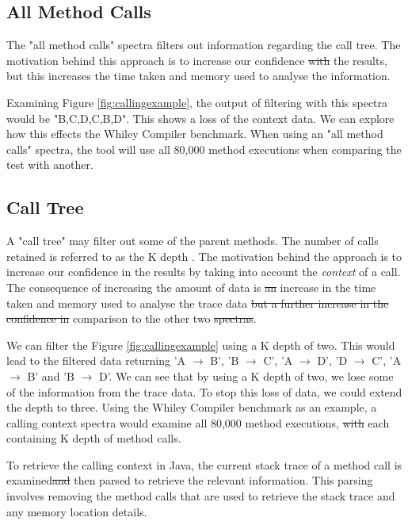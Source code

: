 \documentclass[11pt
              , a4paper
              , twoside
              , openright
              ]{report}
\providecommand{\DIFadd}[1]{{\protect\color{blue}\uwave{#1}}} %
\providecommand{\DIFdel}[1]{{\protect\color{red}\sout{#1}}}                      %
\providecommand{\DIFaddbegin}{} %
\providecommand{\DIFaddend}{} %
\providecommand{\DIFdelbegin}{} %
\providecommand{\DIFdelend}{} %
\begin{document}
\subsection{All Method Calls}
The "all method calls" spectra filters out information regarding the call tree. The motivation behind this approach is to increase our confidence \DIFdelbegin \DIFdel{with }\DIFdelend \DIFaddbegin \DIFadd{in }\DIFaddend the results, but this increases the time taken and memory used to analyse the information.

Examining Figure \ref{fig:callingexample}, the output of filtering with this spectra would be "B,C,D,C,B,D". This shows a loss of the context data. We can explore how this effects the Whiley Compiler benchmark. When using an "all method calls" spectra, the tool will use all 80,000 method executions when comparing the test with another.

\subsection{Call Tree}
A "call tree" may filter out some of the parent methods. The number of calls retained is referred to as the K depth \cite{Zhuang06accurate}. The motivation behind the approach is to increase our confidence in the results by taking into account the \textit{context} of a call. The consequence of increasing the amount of data is \DIFdelbegin \DIFdel{an }\DIFdelend \DIFaddbegin \DIFadd{a further }\DIFaddend increase in the time taken and memory used to analyse the trace data \DIFdelbegin \DIFdel{but a further increase in the confidence in }\DIFdelend \DIFaddbegin \DIFadd{in }\DIFaddend comparison to the other two \DIFdelbegin \DIFdel{spectras}\DIFdelend \DIFaddbegin \DIFadd{spectrums}\DIFaddend .

We can filter the Figure \ref{fig:callingexample} using a K depth of two. This would lead to the filtered data returning 'A $\rightarrow$ B', 'B $\rightarrow$ C', 'A $\rightarrow$ D', 'D $\rightarrow$ C', 'A $\rightarrow$ B' and 'B $\rightarrow$ D'. We can see that by using a K depth of two, we lose some of the information from the trace data. To stop this loss of data, we could extend the depth to three. Using the Whiley Compiler benchmark as an example, a calling context spectra would examine all 80,000 method executions, \DIFdelbegin \DIFdel{with }\DIFdelend each containing K depth of method calls. 

To retrieve the calling context in Java, the current stack trace of a method call is examined\DIFdelbegin \DIFdel{and }\DIFdelend \DIFaddbegin \DIFadd{. It is }\DIFaddend then parsed to retrieve the relevant information. This parsing involves removing the method calls that are used to retrieve the stack trace and any memory location details. 
\end{document}
